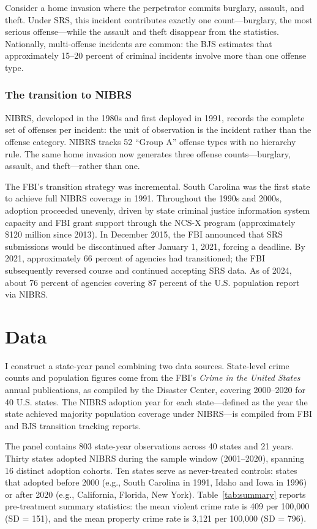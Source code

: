 \documentclass[12pt]{article}
\begin{document}
Consider a home invasion where the perpetrator commits burglary, assault, and theft. Under SRS, this incident contributes exactly one count---burglary, the most serious offense---while the assault and theft disappear from the statistics. Nationally, multi-offense incidents are common: the BJS estimates that approximately 15--20 percent of criminal incidents involve more than one offense type.

\subsubsection*{The transition to NIBRS} NIBRS, developed in the 1980s and first deployed in 1991, records the complete set of offenses per incident: the unit of observation is the incident rather than the offense category. NIBRS tracks 52 ``Group A'' offense types with no hierarchy rule. The same home invasion now generates three offense counts---burglary, assault, and theft---rather than one.

The FBI's transition strategy was incremental. South Carolina was the first state to achieve full NIBRS coverage in 1991. Throughout the 1990s and 2000s, adoption proceeded unevenly, driven by state criminal justice information system capacity and FBI grant support through the NCS-X program (approximately \$120 million since 2013). In December 2015, the FBI announced that SRS submissions would be discontinued after January 1, 2021, forcing a deadline. By 2021, approximately 66 percent of agencies had transitioned; the FBI subsequently reversed course and continued accepting SRS data. As of 2024, about 76 percent of agencies covering 87 percent of the U.S. population report via NIBRS.

\section{Data}

I construct a state-year panel combining two data sources. State-level crime counts and population figures come from the FBI's \textit{Crime in the United States} annual publications, as compiled by the Disaster Center, covering 2000--2020 for 40 U.S. states. The NIBRS adoption year for each state---defined as the year the state achieved majority population coverage under NIBRS---is compiled from FBI and BJS transition tracking reports.

The panel contains 803 state-year observations across 40 states and 21 years. Thirty states adopted NIBRS during the sample window (2001--2020), spanning 16 distinct adoption cohorts. Ten states serve as never-treated controls: states that adopted before 2000 (e.g., South Carolina in 1991, Idaho and Iowa in 1996) or after 2020 (e.g., California, Florida, New York). Table~\ref{tab:summary} reports pre-treatment summary statistics: the mean violent crime rate is 409 per 100,000 (SD = 151), and the mean property crime rate is 3,121 per 100,000 (SD = 796).
\end{document}
